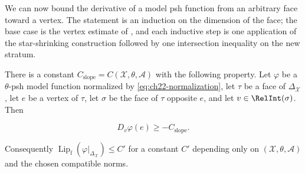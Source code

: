 We can now bound the derivative of a model psh function from an arbitrary
face toward a vertex.  The statement is an induction on the dimension of the
face; the base case is the vertex estimate of
, and each inductive step is one application
of the star-shrinking construction followed by one intersection inequality
on the new stratum.

\begin{proposition}
\label{prop:ch22-slope-estimate}
There is a constant $C_{\mathrm{slope}}=C(\mathcal X,\theta,\mathcal A)$
with the following property.  Let $\varphi$ be a $\theta$-psh model
function normalized by \eqref{eq:ch22-normalization}, let $\tau$ be a face
of $\Delta_{\mathcal X}$, let $e$ be a vertex of $\tau$, let $\sigma$
be the face of $\tau$ opposite $e$, and let $v\in\RelInt(\sigma)$.
Then

\[
                    D_v\varphi(e)\geq-C_{\mathrm{slope}} .
\tag{22.43}\label{eq:ch22-slope-lower-bound}
\]

Consequently $\operatorname{Lip}_{\mathrm f}(\varphi|_{\Delta_{\mathcal X}})
\leq C'$ for a constant $C'$ depending only on
$(\mathcal X,\theta,\mathcal A)$ and the chosen compatible norms.
\end{proposition}


